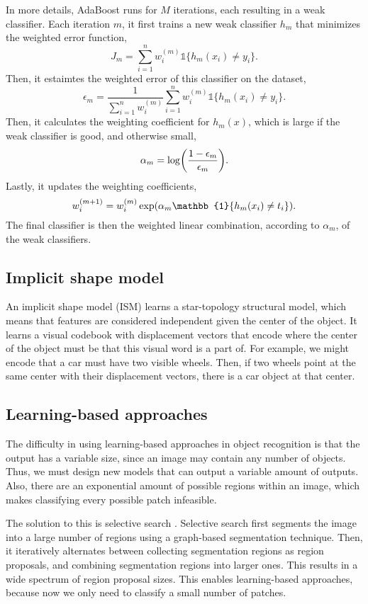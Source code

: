 In more details, AdaBoost \citep{freund1996experiments} runs for $M$
iterations, each resulting in a weak classifier. Each iteration $m$, it first
trains a new weak classifier $h_m$ that minimizes the weighted error function,
\[
  J_m = \sum_{i=1}^n w_i^{(m)} \mathbb{1} \{ h_m(x_i) \neq y_i \}
.\]
Then, it estaimtes the weighted error of this classifier on the dataset, \[
  \epsilon_m = \frac{1}{\sum_{i=1}^n w_i^{(m)}} \sum_{i=1}^n w_i^{(m)} \mathbb{1} \{ h_m(x_i) \neq y_i \}
.\]
Then, it calculates the weighting coefficient for $h_m(x)$, which is large if
the weak classifier is good, and otherwise small, \[
  \alpha_m = \log \lft( \frac{1 - \epsilon_m}{\epsilon_m} \rgt)
.\]
Lastly, it updates the weighting coefficients, \[
  w_i^{(m+1)} = w_i^{(m)} \exp\lft( \alpha_m \mathbb{1} \{ h_m(x_i) \neq t_i \} \rgt)
.\]
The final classifier is then the weighted linear combination, according to
$\alpha_m$, of the weak classifiers.

\subsection{Implicit shape model}

An implicit shape model (ISM) learns a star-topology structural model, which
means that features are considered independent given the center of the object.
It learns a visual codebook with displacement vectors that encode where the
center of the object must be that this visual word is a part of. For example,
we might encode that a car must have two visible wheels. Then, if two wheels
point at the same center with their displacement vectors, there is a car object
at that center.

\subsection{Learning-based approaches}

The difficulty in using learning-based approaches in object recognition is that
the output has a variable size, since an image may contain any number of
objects. Thus, we must design new models that can output a variable amount of
outputs. Also, there are an exponential amount of possible regions within an
image, which makes classifying every possible patch infeasible.

The solution to this is selective search \citep{uijlings2013selective}.
Selective search first segments the image into a large number of regions using
a graph-based segmentation technique. Then, it iteratively alternates between
collecting segmentation regions as region proposals, and combining segmentation
regions into larger ones. This results in a wide spectrum of region proposal
sizes. This enables learning-based approaches, because now we only need to
classify a small number of patches.

